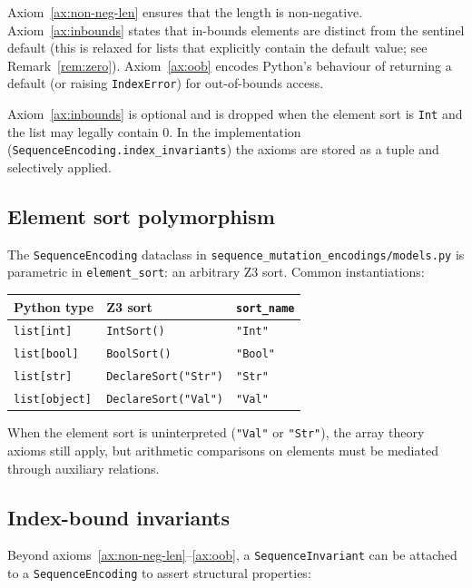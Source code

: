 \documentclass[11pt]{article}
\begin{document}
Axiom~\eqref{ax:non-neg-len} ensures that the length is non-negative.
Axiom~\eqref{ax:inbounds} states that in-bounds elements are distinct from the
sentinel default (this is relaxed for lists that explicitly contain the default
value; see Remark~\ref{rem:zero}).
Axiom~\eqref{ax:oob} encodes Python's behaviour of returning a default
(or raising \texttt{IndexError}) for out-of-bounds access.

\begin{remark}\label{rem:zero}
Axiom~\eqref{ax:inbounds} is optional and is dropped when the element sort
is \texttt{Int} and the list may legally contain $0$.  In the implementation
(\texttt{SequenceEncoding.index\_invariants}) the axioms are stored as a
tuple and selectively applied.
\end{remark}

\subsection{Element sort polymorphism}

The \texttt{SequenceEncoding} dataclass in
\texttt{sequence\_mutation\_encodings/models.py} is parametric in
\texttt{element\_sort}: an arbitrary Z3 sort.  Common instantiations:
\begin{center}
\begin{tabular}{lll}
\toprule
Python type & Z3 sort & \texttt{sort\_name}\\
\midrule
\texttt{list[int]} & \texttt{IntSort()} & \texttt{"Int"}\\
\texttt{list[bool]} & \texttt{BoolSort()} & \texttt{"Bool"}\\
\texttt{list[str]} & \texttt{DeclareSort("Str")} & \texttt{"Str"}\\
\texttt{list[object]} & \texttt{DeclareSort("Val")} & \texttt{"Val"}\\
\bottomrule
\end{tabular}
\end{center}
When the element sort is uninterpreted (\texttt{"Val"} or \texttt{"Str"}), the
array theory axioms still apply, but arithmetic comparisons on elements must
be mediated through auxiliary relations.

\subsection{Index-bound invariants}

Beyond axioms~\eqref{ax:non-neg-len}--\eqref{ax:oob}, a
\texttt{SequenceInvariant} can be attached to a \texttt{SequenceEncoding} to
assert structural properties:
\end{document}
